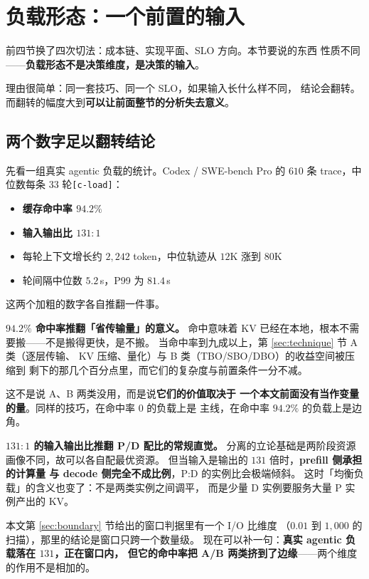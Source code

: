 \section{负载形态：一个前置的输入}
\label{sec:load}

前四节换了四次切法：成本链、实现平面、SLO 方向。本节要说的东西
性质不同——\textbf{负载形态不是决策维度，是决策的输入}。

理由很简单：同一套技巧、同一个 SLO，如果输入长什么样不同，
结论会翻转。而翻转的幅度大到\textbf{可以让前面整节的分析失去意义}。

\subsection{两个数字足以翻转结论}

先看一组真实 agentic 负载的统计。Codex / SWE-bench Pro 的
$610$ 条 trace，中位数每条 $33$ 轮\texttt{[c-load]}：

\begin{itemize}[leftmargin=1.3em,itemsep=1.5pt,topsep=2pt]
  \item \textbf{缓存命中率 $94.2\%$}
  \item \textbf{输入输出比 $131:1$}
  \item 每轮上下文增长约 $2{,}242$ token，中位轨迹从 $12$K 涨到 $80$K
  \item 轮间隔中位数 $5.2$\,s，P99 为 $81.4$\,s
\end{itemize}

\noindent 这两个加粗的数字各自推翻一件事。

\noindent\textbf{$94.2\%$ 命中率推翻「省传输量」的意义。} 命中意味着
KV 已经在本地，根本不需要搬——不是搬得更快，是不搬。
当命中率到九成以上，第 \ref{sec:technique} 节 A 类（逐层传输、
KV 压缩、量化）与 B 类（TBO/SBO/DBO）的收益空间被压缩到
剩下的那几个百分点里，而它们的复杂度与前置条件一分不减。

\noindent 这不是说 A、B 两类没用，而是说\textbf{它们的价值取决于
一个本文前面没有当作变量的量}。同样的技巧，在命中率 $0$ 的负载上是
主线，在命中率 $94.2\%$ 的负载上是边角。

\noindent\textbf{$131:1$ 的输入输出比推翻 P/D 配比的常规直觉。}
分离的立论基础是两阶段资源画像不同，故可以各自配最优资源。
但当输入是输出的 $131$ 倍时，\textbf{prefill 侧承担的计算量
与 decode 侧完全不成比例}，P:D 的实例比会极端倾斜。
这时「均衡负载」的含义也变了：不是两类实例之间调平，
而是少量 D 实例要服务大量 P 实例产出的 KV。

\noindent 本文第 \ref{sec:boundary} 节给出的窗口判据里有一个 I/O 比维度
（$0.01$ 到 $1{,}000$ 的扫描），那里的结论是窗口只跨一个数量级。
现在可以补一句：\textbf{真实 agentic 负载落在 $131$，正在窗口内，
但它的命中率把 A/B 两类挤到了边缘}——两个维度的作用不是相加的。


